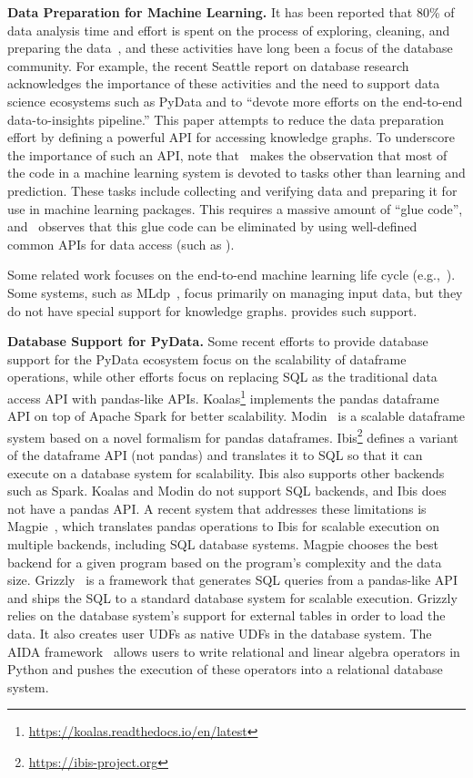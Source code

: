 
\noindent
\textbf{Data Preparation for Machine Learning.}
It has been reported that 80\% of data analysis time and effort is spent on
the process of exploring, cleaning, and preparing the data~\cite{dasu2003exploratory},
and these activities have long been a focus of the database community.
For example, the recent Seattle report on database research~\cite{SeattleDBReport2019}
acknowledges the importance of these activities and the need to support data science ecosystems such as PyData and to ``devote more efforts on the end-to-end data-to-insights pipeline.''
This paper attempts to reduce the data preparation effort by defining a powerful API for accessing knowledge graphs.
To underscore the importance of such an API, note that~\cite{hidden_debt} makes the observation that most of the code in a machine learning system is devoted to tasks other than learning and prediction.
These tasks include collecting and verifying data and preparing it for use in machine learning packages.
This requires a massive amount of ``glue code'', and~\cite{hidden_debt} observes that this glue code can be eliminated by using well-defined common APIs for data access (such as \rdfframes).

Some related work focuses on the end-to-end  machine learning life cycle (e.g.,~\cite{tfx,mlflow,mldp}).
Some systems, such as MLdp~\cite{mldp}, focus primarily on managing input data, 
but they do not have special support for knowledge graphs. \rdfframes provides such support.

\vspace{4pt}
\noindent
\textbf{Database Support for PyData.}
Some recent efforts to provide database support for the PyData ecosystem focus on the scalability of dataframe operations, while other efforts focus on replacing SQL as the traditional data access API with pandas-like APIs.
Koalas\footnote{\url{https://koalas.readthedocs.io/en/latest}}
implements the pandas dataframe API on top of Apache Spark for better scalability.
Modin~\cite{modin} is a scalable dataframe system based on a novel formalism for pandas dataframes.
Ibis\footnote{\url{https://ibis-project.org}}
defines a variant of the dataframe API
(not pandas)
and translates it to SQL so that it can execute on a database system for scalability. Ibis also supports other backends such as Spark.
Koalas and Modin do not support SQL backends, and Ibis does not have a pandas API.
A recent system that addresses these limitations is
Magpie~\cite{magpie},
which
translates pandas operations to Ibis for scalable execution on multiple backends, including SQL database systems. Magpie chooses the best backend for a given program based on the program's complexity and the data size.
Grizzly~\cite{grizzly} is a framework that generates SQL queries from a pandas-like API and ships the SQL to a standard database system for scalable execution.
Grizzly relies on the database system's support for external tables in order to load the data.
It also 
creates user UDFs as native UDFs in the database system.
The AIDA framework~\cite{AIDA2018} allows users to write relational and linear algebra operators in Python and pushes the execution of these operators into a relational database system.


